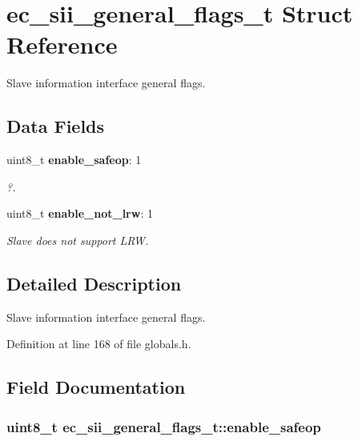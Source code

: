 \section{ec\-\_\-sii\-\_\-general\-\_\-flags\-\_\-t \-Struct \-Reference}
\label{structec__sii__general__flags__t}


\-Slave information interface general flags.  


\subsection*{\-Data \-Fields}
\begin{DoxyCompactItemize}
\item 
uint8\-\_\-t {\bf enable\-\_\-safeop}\-: 1
\begin{DoxyCompactList}\small\item\em ?. \end{DoxyCompactList}\item 
uint8\-\_\-t {\bf enable\-\_\-not\-\_\-lrw}\-: 1
\begin{DoxyCompactList}\small\item\em \-Slave does not support \-L\-R\-W. \end{DoxyCompactList}\end{DoxyCompactItemize}


\subsection{\-Detailed \-Description}
\-Slave information interface general flags. 

\-Definition at line 168 of file globals.\-h.



\subsection{\-Field \-Documentation}
\subsubsection[{enable\-\_\-safeop}]{\setlength{\rightskip}{0pt plus 5cm}uint8\-\_\-t {\bf ec\-\_\-sii\-\_\-general\-\_\-flags\-\_\-t\-::enable\-\_\-safeop}}\label{structec__sii__general__flags__t_a06c42cdbd02ae8d4029d72db27a43ade}


